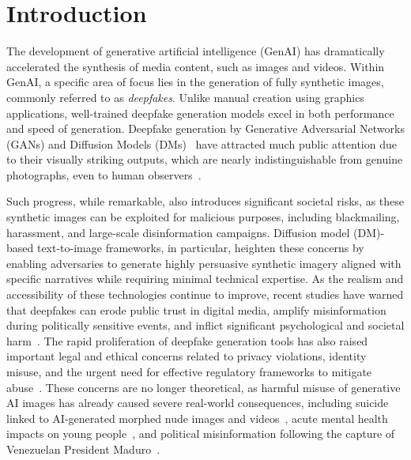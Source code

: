 \documentclass[letterpaper,twocolumn,10pt]{article}
\begin{document}
\section{Introduction}

\noindent The development of generative artificial intelligence (GenAI) has dramatically accelerated the synthesis of media content, such as images and videos. Within GenAI, a specific area of focus lies in the generation of fully synthetic images, commonly referred to as \emph{deepfakes}. Unlike manual creation using graphics applications, well-trained deepfake  generation models excel in both performance and speed of generation. Deepfake  generation by Generative Adversarial Networks (GANs) and Diffusion Models (DMs)~\cite{sohl2015Nonequilibriumthermodynamics, Podell2024sdxl, rombach2022ldm, Liu2023rectifiedflow, Esser2024rectifiedflow, zhang2025diffusion4k} have attracted much public attention due to their visually striking outputs, which are nearly indistinguishable from genuine photographs, even to human observers~\cite{Nightingale2022AISynthesized}. 

Such progress, while remarkable, also introduces significant societal risks, as these synthetic images can be exploited for malicious purposes, including blackmailing, harassment, and large-scale disinformation campaigns. Diffusion model (DM)-based text-to-image frameworks, in particular, heighten these concerns by enabling adversaries to generate highly persuasive synthetic imagery aligned with specific narratives while requiring minimal technical expertise. As the realism and accessibility of these technologies continue to improve, recent studies have warned that deepfakes can erode public trust in digital media, amplify misinformation during politically sensitive events, and inflict significant psychological and societal harm~\cite{alanazi2025unmasking}. 
The rapid proliferation of deepfake generation tools has also raised important legal and ethical concerns related to privacy violations, identity misuse, and the urgent need for effective regulatory frameworks to mitigate abuse~\cite{meskys2020regulating}. These concerns are no longer theoretical, as harmful misuse of generative AI images has already caused severe real-world consequences, including suicide linked to AI-generated morphed nude images and videos~\cite{toi_ai_blackmail_suicide_2025}, acute mental health impacts on young people~\cite{guardian_deepfake_porn_schools_2025}, and political misinformation following the capture of Venezuelan President Maduro~\cite{guardian2026maduroai}.
\end{document}
